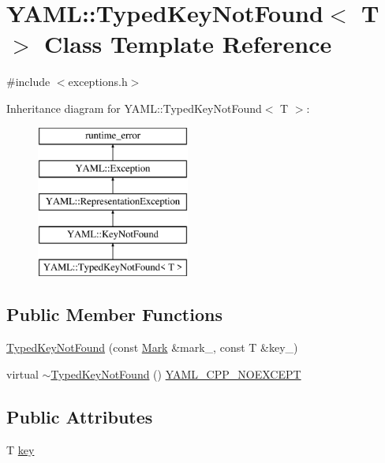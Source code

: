 \hypertarget{class_y_a_m_l_1_1_typed_key_not_found}{}\section{Y\+A\+ML\+::Typed\+Key\+Not\+Found$<$ T $>$ Class Template Reference}
\label{class_y_a_m_l_1_1_typed_key_not_found}


{\ttfamily \#include $<$exceptions.\+h$>$}

Inheritance diagram for Y\+A\+ML\+::Typed\+Key\+Not\+Found$<$ T $>$\+:\begin{figure}[H]
\begin{center}
\leavevmode
\includegraphics[height=5.000000cm]{class_y_a_m_l_1_1_typed_key_not_found}
\end{center}
\end{figure}
\subsection*{Public Member Functions}
\begin{DoxyCompactItemize}
\item 
\mbox{\hyperlink{class_y_a_m_l_1_1_typed_key_not_found_a134f072998bef18a9df88821b5c7f676}{Typed\+Key\+Not\+Found}} (const \mbox{\hyperlink{struct_y_a_m_l_1_1_mark}{Mark}} \&mark\+\_\+, const T \&key\+\_\+)
\item 
virtual \mbox{\hyperlink{class_y_a_m_l_1_1_typed_key_not_found_a62707b7744d89b4120bc07829a3af14d}{$\sim$\+Typed\+Key\+Not\+Found}} () \mbox{\hyperlink{exceptions_8cpp_a4ea58eb0a28000364858d4942add7d1a}{Y\+A\+M\+L\+\_\+\+C\+P\+P\+\_\+\+N\+O\+E\+X\+C\+E\+PT}}
\end{DoxyCompactItemize}
\subsection*{Public Attributes}
\begin{DoxyCompactItemize}
\item 
T \mbox{\hyperlink{class_y_a_m_l_1_1_typed_key_not_found_a5ad894d0c3bf1ed295131be1e0543857}{key}}
\end{DoxyCompactItemize}


